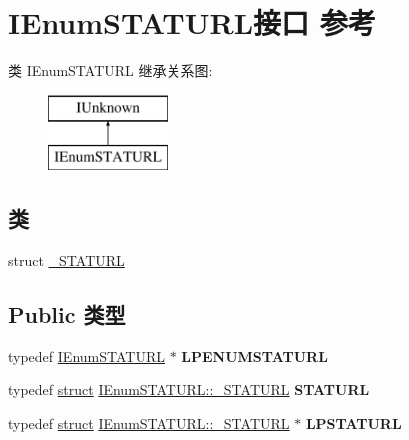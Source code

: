 \hypertarget{interface_i_enum_s_t_a_t_u_r_l}{}\section{I\+Enum\+S\+T\+A\+T\+U\+R\+L接口 参考}
\label{interface_i_enum_s_t_a_t_u_r_l}
类 I\+Enum\+S\+T\+A\+T\+U\+RL 继承关系图\+:\begin{figure}[H]
\begin{center}
\leavevmode
\includegraphics[height=2.000000cm]{interface_i_enum_s_t_a_t_u_r_l}
\end{center}
\end{figure}
\subsection*{类}
\begin{DoxyCompactItemize}
\item 
struct \hyperlink{struct_i_enum_s_t_a_t_u_r_l_1_1___s_t_a_t_u_r_l}{\+\_\+\+S\+T\+A\+T\+U\+RL}
\end{DoxyCompactItemize}
\subsection*{Public 类型}
\begin{DoxyCompactItemize}
\item 
\mbox{\label{interface_i_enum_s_t_a_t_u_r_l_a083c9a07c841e08bd88935bd2dce5fd8}} 
typedef \hyperlink{interface_i_enum_s_t_a_t_u_r_l}{I\+Enum\+S\+T\+A\+T\+U\+RL} $\ast$ {\bfseries L\+P\+E\+N\+U\+M\+S\+T\+A\+T\+U\+RL}
\item 
\mbox{\label{interface_i_enum_s_t_a_t_u_r_l_a40abdb6738f957b8925f7d98bdb6221e}} 
typedef \hyperlink{interfacestruct}{struct} \hyperlink{struct_i_enum_s_t_a_t_u_r_l_1_1___s_t_a_t_u_r_l}{I\+Enum\+S\+T\+A\+T\+U\+R\+L\+::\+\_\+\+S\+T\+A\+T\+U\+RL} {\bfseries S\+T\+A\+T\+U\+RL}
\item 
\mbox{\label{interface_i_enum_s_t_a_t_u_r_l_a5328763d79042d48cd85518b66ed90ee}} 
typedef \hyperlink{interfacestruct}{struct} \hyperlink{struct_i_enum_s_t_a_t_u_r_l_1_1___s_t_a_t_u_r_l}{I\+Enum\+S\+T\+A\+T\+U\+R\+L\+::\+\_\+\+S\+T\+A\+T\+U\+RL} $\ast$ {\bfseries L\+P\+S\+T\+A\+T\+U\+RL}
\end{DoxyCompactItemize}
